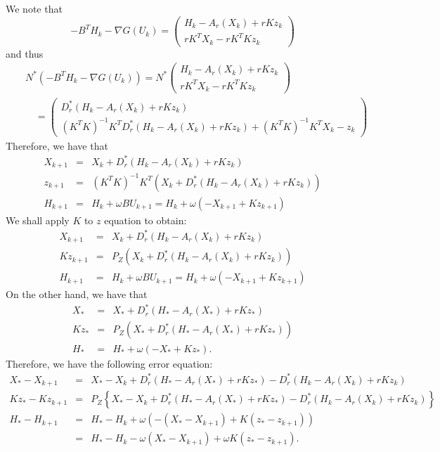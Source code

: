 We note that 
\begin{equation}
-B^TH_k - \nabla G(U_k) = \begin{pmatrix} H_k - A_r(X_k) + rK z_k \\ rK^T X_k - r K^T K z_k \end{pmatrix} 
\end{equation}
and thus 
\begin{eqnarray*}
&& N^{*}(-B^TH_k - \nabla G(U_k)) = N^{*} \begin{pmatrix} H_k - A_r(X_k) + rK z_k \\ rK^T X_k - r K^T K z_k \end{pmatrix} \\
&& \quad = 
\begin{pmatrix} D_r^{*} (H_k - A_r(X_k) + rK z_k) \\ (K^TK)^{-1} K^T D_r^{*} (H_k - A_r(X_k) + rK z_k) + (K^T K)^{-1}K^T X_k - z_k \end{pmatrix}
\end{eqnarray*}
Therefore, we have that 
\begin{eqnarray*}
X_{k+1} &=& X_k + D_r^{*} (H_k - A_r(X_k) + r K z_k) \\
z_{k+1} &=& (K^TK)^{-1} K^T (X_{k} + D_r^{*} (H_k - A_r(X_k) + r K z_k)) \\ 
H_{k+1} &=& H_k + \omega B U_{k+1} = H_k + \omega (-X_{k+1} + Kz_{k+1} )
\end{eqnarray*}
We shall apply $K$ to $z$ equation to obtain: 
\begin{eqnarray*}
X_{k+1} &=& X_k + D_r^{*} (H_k - A_r(X_k) + r K z_k) \\
Kz_{k+1} &=& P_Z (X_{k} + D_r^{*} (H_k - A_r(X_k) + r K z_k)) \\ 
H_{k+1} &=& H_k + \omega B U_{k+1} = H_k + \omega (-X_{k+1} + Kz_{k+1} )
\end{eqnarray*}
On the other hand, we have that 
\begin{eqnarray*}
X_{*} &=& X_* + D_r^{*} (H_* - A_r(X_*) + r K z_*) \\
Kz_{*} &=& P_Z (X_* + D_r^{*} (H_* - A_r(X_*) + rK z_*)) \\ 
H_{*} &=& H_* + \omega (-X_{*} + K z_{*}). 
\end{eqnarray*}
Therefore, we have the following error equation: 
\begin{eqnarray*}
X_{*} - X_{k+1} &=& X_* - X_k + D_r^{*} (H_* - A_r(X_*) + r K z_*) - D_r^{*} (H_k - A_r(X_k) + r K z_k) \\
Kz_{*} - Kz_{k+1} &=& P_Z \left \{ X_* - X_k + D_r^{*} (H_* - A_r(X_*) + rK z_*) - D_r^{*} (H_k - A_r(X_k) + rK z_k) \right \} \\
H_{*} - H_{k+1} &=& H_* - H_k + \omega (-(X_{*} - X_{k+1}) + K(z_{*} - z_{k+1})) \\ 
&=& H_* - H_k - \omega (X_{*} - X_{k+1}) + \omega K( z_{*} - z_{k+1}). 
\end{eqnarray*}

